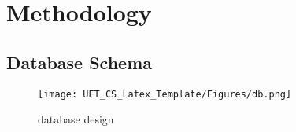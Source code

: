
\chapter{Methodology} %
\label{Chapter2}

\pagebreak
\section{Database Schema}
{
\begin{figure}[h]
    \centering
    \texttt{[image: UET\_CS\_Latex\_Template/Figures/db.png]}
    \caption{database design}
    \label{fig:my_label}
\end{figure}
}

